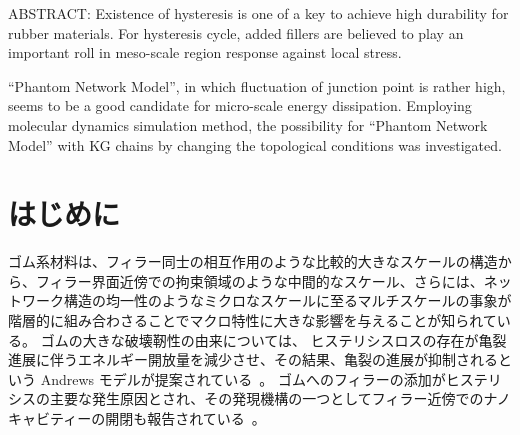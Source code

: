 \documentclass[uplatex,10pt,a4paper,twocolumn]{jsarticle}
\begin{document}


\begin{spacing}{0.95}
ABSTRACT: 
Existence of hysteresis is one of a key to achieve high durability for rubber materials.
For hysteresis cycle, added fillers are believed to play an important roll in meso-scale region response against local stress.

``Phantom Network Model'', in which fluctuation of junction point is rather high, seems to be a good candidate for micro-scale energy dissipation.
Employing molecular dynamics simulation method, the possibility for ``Phantom Network Model'' with KG chains by changing the topological conditions was investigated.
\end{spacing}

\section{はじめに}

\vspace{-2mm}
ゴム系材料は、フィラー同士の相互作用のような比較的大きなスケールの構造から、フィラー界面近傍での拘束領域のような中間的なスケール、さらには、ネットワーク構造の均一性のようなミクロなスケールに至るマルチスケールの事象が階層的に組み合わさることでマクロ特性に大きな影響を与えることが知られている。
ゴムの大きな破壊靭性の由来については、 ヒステリシスロスの存在が亀裂進展に伴うエネルギー開放量を減少させ、その結果、亀裂の進展が抑制されるという Andrews モデルが提案されている~\cite{Andrews1977}。
ゴムへのフィラーの添加がヒステリシスの主要な発生原因とされ、その発現機構の一つとしてフィラー近傍でのナノキャビティーの開閉も報告されている~\cite{Zhang2013}。
\end{document}
